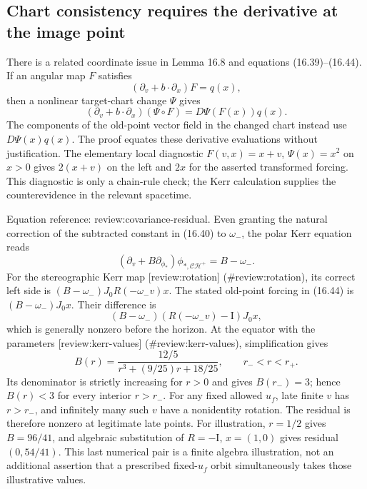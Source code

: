 \documentclass[10pt]{article}
\begin{document}
\subsection*{Chart consistency requires the derivative at the image point}
There is a related coordinate issue in Lemma 16.8 and equations (16.39)–(16.44). If an angular map \(F\) satisfies \[(\partial_v+b\mathbin{\cdot}\partial_x)F=q(x),\] then a nonlinear target-chart change \(\Psi\) gives \[(\partial_v+b\mathbin{\cdot}\partial_x)(\Psi\circ F)
       =D\Psi(F(x))q(x).\] The components of the old-point vector field in the changed chart instead use \(D\Psi(x)q(x)\). The proof equates these derivative evaluations without justification. The elementary local diagnostic \(F(v,x)=x+v\), \(\Psi(x)=x^2\) on \(x>0\) gives \(2(x+v)\) on the left and \(2x\) for the asserted transformed forcing. This diagnostic is only a chain-rule check; the Kerr calculation supplies the counterevidence in the relevant spacetime.\par
Equation reference: review:covariance-residual. Even granting the natural correction of the subtracted constant in (16.40) to \(\omega_-\), the polar Kerr equation reads \[(\partial_v+B\partial_{\phi_*})\phi_{*,\mathcal{CH}^{+}}=B-\omega_-.\] For the stereographic Kerr map [review:rotation] (\#review:rotation), its correct left side is \((B-\omega_-)J_0R(-\omega_-v)x\). The stated old-point forcing in (16.44) is \((B-\omega_-)J_0x\). Their difference is \[
 (B-\omega_-)(R(-\omega_-v)-\mathrm I)J_0x,\] which is generally nonzero before the horizon. At the equator with the parameters [review:kerr-values] (\#review:kerr-values), simplification gives \[B(r)=\frac{12/5}{r^3+(9/25)r+18/25},\qquad r_-<r<r_+.\] Its denominator is strictly increasing for \(r>0\) and gives \(B(r_-) =3\); hence \(B(r)<3\) for every interior \(r>r_-\). For any fixed allowed \(u_f\), late finite \(v\) has \(r>r_-\), and infinitely many such \(v\) have a nonidentity rotation. The residual is therefore nonzero at legitimate late points. For illustration, \(r=1/2\) gives \(B=96/41\), and algebraic substitution of \(R=-\mathrm I\), \(x=(1,0)\) gives residual \((0,54/41)\). This last numerical pair is a finite algebra illustration, not an additional assertion that a prescribed fixed-\(u_f\) orbit simultaneously takes those illustrative values.\par
\end{document}
